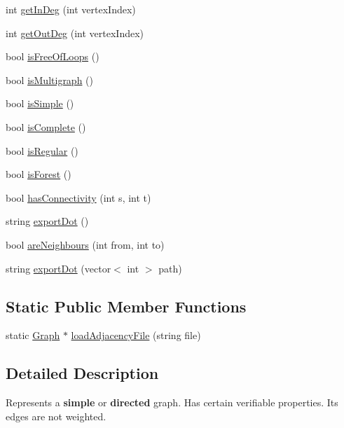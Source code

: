 \begin{DoxyCompactItemize}
\item 
int \hyperlink{class_graph_aa22848281e37e921bf4fc998bcf66295}{get\-In\-Deg} (int vertex\-Index)
\item 
int \hyperlink{class_graph_a1facc5271ce6c09e06bce134ddaac98c}{get\-Out\-Deg} (int vertex\-Index)
\item 
bool \hyperlink{class_graph_a451bbc2d9ddde5e85d6c122a845dbd02}{is\-Free\-Of\-Loops} ()
\item 
bool \hyperlink{class_graph_ab410dec3635c080f04c60c6835d91df6}{is\-Multigraph} ()
\item 
bool \hyperlink{class_graph_a4095f5949d5b2a420ecf2d0f2bb68dc8}{is\-Simple} ()
\item 
bool \hyperlink{class_graph_aba9eba8899f63a67ed270ee00bdfeb4e}{is\-Complete} ()
\item 
bool \hyperlink{class_graph_afe19c30e6b7005fd0c66c5f182764ca5}{is\-Regular} ()
\item 
bool \hyperlink{class_graph_a3c59cca56e627174ff1138c332dcc328}{is\-Forest} ()
\item 
bool \hyperlink{class_graph_a46cb0098da247fd0f2b07229df8cd5e7}{has\-Connectivity} (int s, int t)
\item 
string \hyperlink{class_graph_aaa3e920d6063f97f1826ced6180962ee}{export\-Dot} ()
\item 
bool \hyperlink{class_graph_ad3689ff1213976a5d738813be6ecee0d}{are\-Neighbours} (int from, int to)
\item 
string \hyperlink{class_graph_a5898714a35ec10f29610e6e06f82c8c8}{export\-Dot} (vector$<$ int $>$ path)
\end{DoxyCompactItemize}
\subsection*{Static Public Member Functions}
\begin{DoxyCompactItemize}
\item 
static \hyperlink{class_graph}{Graph} $\ast$ \hyperlink{class_graph_ac7aae6ec6ef87e6273c4cd4f5bbd4efa}{load\-Adjacency\-File} (string file)
\end{DoxyCompactItemize}


\subsection{Detailed Description}
Represents a {\bfseries simple} or {\bfseries directed} graph. Has certain verifiable properties. Its edges are not weighted. 

